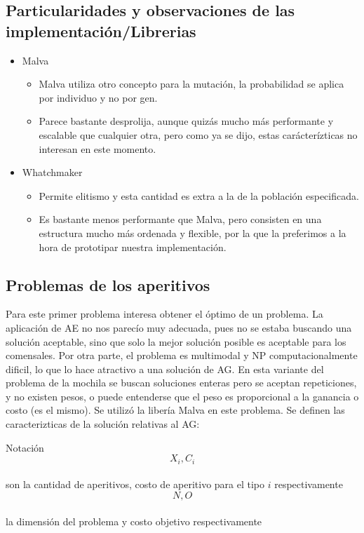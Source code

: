 \documentclass[9pt,conference]{IEEEtran}
\begin{document}
	\subsection{Particularidades y observaciones de las implementaci\'on/Librerias}
	\begin{itemize}
		\item Malva
		\begin{itemize}
			\item Malva utiliza otro concepto para la mutaci\'on, la probabilidad se aplica por individuo y no por gen.
			\item Parece bastante desprolija, aunque quiz\'as mucho m\'as performante y escalable que cualquier otra, pero como ya se dijo, estas car\'acter\'izticas no interesan en este momento.
		\end{itemize}

		\item Whatchmaker
		\begin{itemize}	
			\item Permite elitismo y esta cantidad es extra a la de la poblaci\'on especificada.
			\item Es bastante menos performante que Malva, pero consisten en una estructura mucho m\'as ordenada y flexible, por la que la preferimos a la hora de prototipar nuestra implementaci\'on.
		\end{itemize}
	\end{itemize}

	\subsection{Problemas de los aperitivos}
	
	Para este primer problema interesa obtener el \'optimo de un problema. La aplicaci\'on de AE no nos parec\'io muy adecuada, pues no se estaba buscando una soluci\'on aceptable, sino que solo la mejor soluci\'on posible es aceptable para los comensales. Por otra parte, el problema es multimodal y NP computacionalmente dificil, lo que lo hace atractivo a una soluci\'on de AG.
	En esta variante del problema de la mochila se buscan soluciones enteras pero se aceptan repeticiones, y no existen pesos, o puede entenderse que el peso es proporcional a la ganancia o costo (es el mismo).
	Se utiliz\'o la liber\'ia Malva en este problema.
	Se definen las caracterizticas de la soluci\'on relativas al AG:

	Notaci\'on
		$$X_i,C_i$$\\ son la cantidad de aperitivos, costo de aperitivo para el tipo $i$ respectivamente\\
		$$N,O$$\\ la dimensi\'on del problema y costo objetivo respectivamente\\
\end{document}
